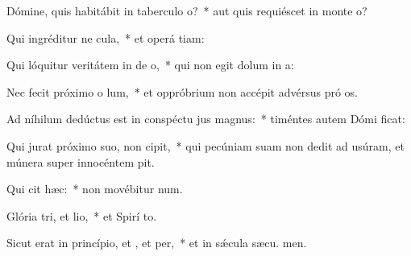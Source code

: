 \item Dómine, quis habitábit in taberculo o?~* aut quis requiéscet in monte  o?
\item Qui ingréditur ne cula,~* et operá tiam:
\item Qui lóquitur veritátem in de o,~* qui non egit dolum in  a:
\item Nec fecit próximo o lum,~* et oppróbrium non accépit advérsus pró os.
\item Ad níhilum dedúctus est in conspéctu jus magnus:~* timéntes autem Dómi ficat:
\item Qui jurat próximo suo,  non cipit,~* qui pecúniam suam non dedit ad usúram, et múnera super innocéntem  pit.
\item Qui cit hæc:~* non movébitur  num.
\item Glória tri, et lio,~* et Spirí to.
\item Sicut erat in princípio, et , et per,~* et in sǽcula sæcu. men.
